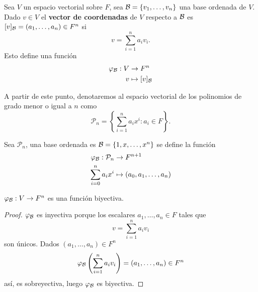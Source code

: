 \documentclass[12pt,a4paper]{book}
\newcommand{\parentesis}[1]{\left(#1\right)}
\newcommand{\llavesgrandes}[1]{\left\{#1\right\}}
\begin{document}
    \begin{definicion}
    \label{def:18}
        Sea $V$ un espacio vectorial sobre $F$, sea $\mathcal{B}=\{v_{1},\dots,v_{n}\}$ una base ordenada
        de $V$. Dado $v\in V$ el \textbf{vector de coordenadas} de $V$ respecto a $\mathcal{B}$ es
        $[v]_{\mathcal{B}}=(a_{1},\dots,a_{n})\in F^{n}$ si
        \begin{equation*}
            v=\sum_{i=1}^{n}a_{i}v_{i}.
        \end{equation*}
        Esto define una función
        \begin{align*}
            \varphi_{\mathcal{B}}:V&\to F^{n}\\
            v&\mapsto[v]_{\mathcal{B}}
        \end{align*}
    \end{definicion}

    A partir de este punto, denotaremos al espacio vectorial de los polinomios de grado menor o igual a $n$ como
    \begin{equation*}
    \mathcal{P}_{n} = \llavesgrandes{\sum_{i = 1}^{n} a_{i}x^{i} : a_{i} \in F}.
    \end{equation*}
    
    \begin{ejemplo}
    \label{ej:19}
        Sea $\mathcal{P}_{n}$, una base ordenada es $\mathcal{B}=\{1,x,\dots,x^{n}\}$ se define la función
        \begin{align*}
            \varphi_{\mathcal{B}}:\mathcal{P}_{n}&\to F^{n+1}\\
            \sum^{n}_{i=0}a_{i}x^{i}&\mapsto(a_{0},a_{1},\dots,a_{n})
        \end{align*}
    \end{ejemplo}

    \begin{proposicion}
    \label{prop:22}
        $\varphi_{\mathcal{B}}:V\to F^{n}$ es una función biyectiva.
    \end{proposicion}

    \begin{proof}
        $\varphi_{\mathcal{B}}$ es inyectiva porque los escalares $a_{1},\dots,a_{n}\in F$ tales que
        \begin{equation*}
            v=\sum_{i=1}^{n}a_{i}v_{i}
        \end{equation*}
        son únicos. Dados $(a_{1},\dots,a_{n})\in F^{n}$
        \begin{equation*}
            \varphi_{\BB}\parentesis{\sum_{i=1}^{n}a_{i}v_{i}}=(a_{1},\dots,a_{n})\in F^{n}
        \end{equation*}
        así, es sobreyectiva, luego $\varphi_{\mathcal{B}}$ es biyectiva.
    \end{proof}
\end{document}
